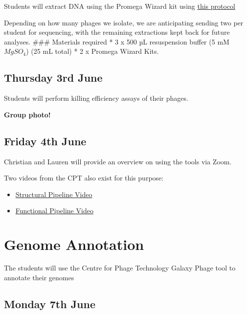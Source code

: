 \documentclass[
]{book}
\providecommand{\tightlist}{%
  \setlength{\itemsep}{0pt}\setlength{\parskip}{0pt}}
\begin{document}
Students will extract DNA using the Promega Wizard kit using \href{https://cpt.tamu.edu/wordpress/wp-content/uploads/2011/12/Phage-DNA-extraction-modified-Wizard-method-07-12-2011.pdf}{this protocol}

Depending on how many phages we isolate, we are anticipating sending two per student for sequencing, with the remaining extractions kept back for future analyses.
\#\#\# Materials required
* 3 x 500 µL resuspension buffer (5 mM \(MgSO_{4}\)) (25 mL total)
* 2 x Promega Wizard Kits.

\hypertarget{thursday-3rd-june}{%
\section{Thursday 3rd June}\label{thursday-3rd-june}}

Students will perform killing efficiency assays of their phages.

\textbf{Group photo!}

\hypertarget{friday-4th-june}{%
\section{Friday 4th June}\label{friday-4th-june}}

Christian and Lauren will provide an overview on using the tools via Zoom.

Two videos from the CPT also exist for this purpose:

\begin{itemize}
\tightlist
\item
  \href{https://t.co/F9Gv0rCHhS}{Structural Pipeline Video}
\item
  \href{https://t.co/5veyKIswWv}{Functional Pipeline Video}
\end{itemize}

\hypertarget{genome-annotation}{%
\chapter{Genome Annotation}\label{genome-annotation}}

The students will use the Centre for Phage Technology Galaxy Phage tool to annotate their genomes

\hypertarget{monday-7th-june}{%
\section{Monday 7th June}\label{monday-7th-june}}
\end{document}
